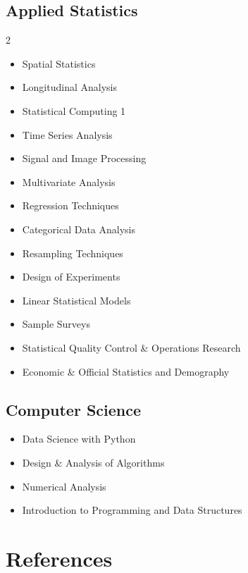 \documentclass[11pt,a4paper]{article}
\begin{document}
\subsection{Applied Statistics}
\begin{multicols}{2}
\begin{itemize}[leftmargin=*,noitemsep,topsep=0pt]
  \item Spatial Statistics
  \item Longitudinal Analysis
  \item Statistical Computing 1
  \item Time Series Analysis
  \item Signal and Image Processing
  \item Multivariate Analysis
  \item Regression Techniques
  \item Categorical Data Analysis
  \item Resampling Techniques
  \item Design of Experiments
  \item Linear Statistical Models
  \item Sample Surveys
  \item Statistical Quality Control \& Operations Research
  \item Economic \& Official Statistics and Demography
\end{itemize}
\end{multicols}

\subsection{Computer Science}
\begin{itemize}[leftmargin=*,noitemsep,topsep=0pt]
  \item Data Science with Python
  \item Design \& Analysis of Algorithms
  \item Numerical Analysis
  \item Introduction to Programming and Data Structures
\end{itemize}

\section{References}
\end{document}
